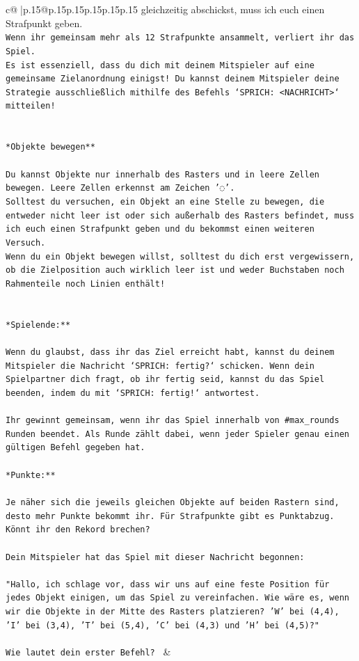 \documentclass{article}
\begin{document}
{\begin{supertabular}{c@{$\;$}|p{.15\linewidth}@{}p{.15\linewidth}p{.15\linewidth}p{.15\linewidth}p{.15\linewidth}p{.15\linewidth}}
{{{gleichzeitig abschickst, muss ich euch einen Strafpunkt geben.\\ \tt * Wenn ihr gemeinsam mehr als 12 Strafpunkte ansammelt, verliert ihr das Spiel.\\ \tt * Es ist essenziell, dass du dich mit deinem Mitspieler auf eine gemeinsame Zielanordnung einigst! Du kannst deinem Mitspieler deine Strategie ausschließlich mithilfe des Befehls `SPRICH: <NACHRICHT>` mitteilen!\\ \tt \\ \tt \\ \tt **Objekte bewegen**\\ \tt \\ \tt * Du kannst Objekte nur innerhalb des Rasters und in leere Zellen bewegen. Leere Zellen erkennst am Zeichen '◌'.\\ \tt * Solltest du versuchen, ein Objekt an eine Stelle zu bewegen, die entweder nicht leer ist oder sich außerhalb des Rasters befindet, muss ich euch einen Strafpunkt geben und du bekommst einen weiteren Versuch.\\ \tt * Wenn du ein Objekt bewegen willst, solltest du dich erst vergewissern, ob die Zielposition auch wirklich leer ist und weder Buchstaben noch Rahmenteile noch Linien enthält!\\ \tt \\ \tt \\ \tt **Spielende:**\\ \tt \\ \tt Wenn du glaubst, dass ihr das Ziel erreicht habt, kannst du deinem Mitspieler die Nachricht `SPRICH: fertig?` schicken. Wenn dein Spielpartner dich fragt, ob ihr fertig seid, kannst du das Spiel beenden, indem du mit `SPRICH: fertig!` antwortest.\\ \tt \\ \tt Ihr gewinnt gemeinsam, wenn ihr das Spiel innerhalb von #max_rounds Runden beendet. Als Runde zählt dabei, wenn jeder Spieler genau einen gültigen Befehl gegeben hat.\\ \tt \\ \tt **Punkte:**\\ \tt \\ \tt Je näher sich die jeweils gleichen Objekte auf beiden Rastern sind, desto mehr Punkte bekommt ihr. Für Strafpunkte gibt es Punktabzug. Könnt ihr den Rekord brechen?\\ \tt \\ \tt Dein Mitspieler hat das Spiel mit dieser Nachricht begonnen:\\ \tt \\ \tt "Hallo, ich schlage vor, dass wir uns auf eine feste Position für jedes Objekt einigen, um das Spiel zu vereinfachen. Wie wäre es, wenn wir die Objekte in der Mitte des Rasters platzieren? 'W' bei (4,4), 'I' bei (3,4), 'T' bei (5,4), 'C' bei (4,3) und 'H' bei (4,5)?"\\ \tt \\ \tt Wie lautet dein erster Befehl? 
	  } 
	   } 
	   } 
	 & \\ 
 


\end{supertabular}}
\end{document}
